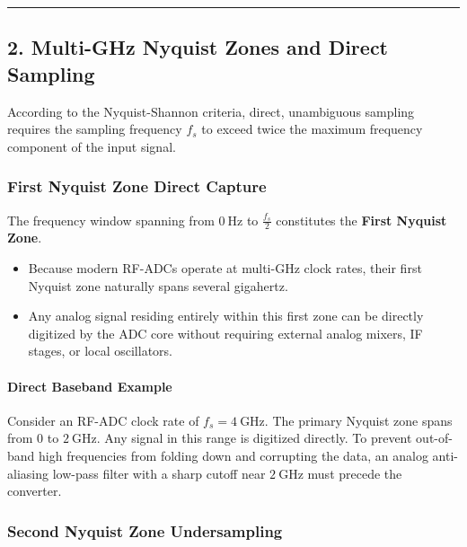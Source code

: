 \documentclass[
]{article}
\providecommand{\tightlist}{%
  \setlength{\itemsep}{0pt}\setlength{\parskip}{0pt}}
\begin{document}
\begin{center}\rule{0.5\linewidth}{0.5pt}\end{center}

\subsection{2. Multi-GHz Nyquist Zones and Direct
Sampling}\label{multi-ghz-nyquist-zones-and-direct-sampling}

According to the Nyquist-Shannon criteria, direct, unambiguous sampling
requires the sampling frequency \(f_s\) to exceed twice the maximum
frequency component of the input signal.

\subsubsection{First Nyquist Zone Direct
Capture}\label{first-nyquist-zone-direct-capture}

The frequency window spanning from \(0\ \text{Hz}\) to \(\frac{f_s}{2}\)
constitutes the \textbf{First Nyquist Zone}.

\begin{itemize}
\tightlist
\item
  Because modern RF-ADCs operate at multi-GHz clock rates, their first
  Nyquist zone naturally spans several gigahertz.
\item
  Any analog signal residing entirely within this first zone can be
  directly digitized by the ADC core without requiring external analog
  mixers, IF stages, or local oscillators.
\end{itemize}

\paragraph{Direct Baseband Example}\label{direct-baseband-example}

Consider an RF-ADC clock rate of \(f_s = 4\ \text{GHz}\). The primary
Nyquist zone spans from \(0\) to \(2\ \text{GHz}\). Any signal in this
range is digitized directly. To prevent out-of-band high frequencies
from folding down and corrupting the data, an analog anti-aliasing
low-pass filter with a sharp cutoff near \(2\ \text{GHz}\) must precede
the converter.

\subsubsection{Second Nyquist Zone
Undersampling}\label{second-nyquist-zone-undersampling}
\end{document}
